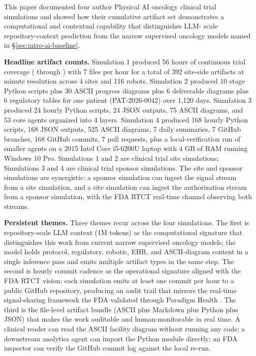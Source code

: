
This paper documented four author Physical AI oncology clinical trial
simulations and showed how their cumulative artifact set demonstrates
a computational and contextual capability that distinguishes LLM-
scale repository-context prediction from the narrow supervised
oncology models named in \S\ref{sec:intro-ai-baseline}.

\textbf{Headline artifact counts.} Simulation 1 produced 56 hours of
continuous trial coverage ( through )
with 7 files per hour for a total of 392 site-side artifacts at
minute resolution across 4 sites and 116 robots. Simulation 2
produced 10 stage Python scripts plus 30 ASCII progress diagrams plus
6 deliverable diagrams plus 6 regulatory tables for one patient
(PAT-2026-0042) over 1,120 days. Simulation 3 produced 24 hourly
Python scripts, 24 JSON outputs, 75 ASCII diagrams, and 53 core
agents organized into 4 layers. Simulation 4 produced 168 hourly
Python scripts, 168 JSON outputs, 525 ASCII diagrams, 7 daily
summaries, 7 GitHub branches, 168 GitHub commits, 7 pull requests,
plus a local-verification run of smaller agents on a 2015 Intel Core i5-6200U
laptop with 4 GB of RAM running Windows 10 Pro. Simulations 1 and 2
are clinical trial site simulations; Simulations 3 and 4 are clinical
trial sponsor simulations. The site and sponsor simulations are
synergistic: a sponsor simulation can ingest the signal stream from a
site simulation, and a site simulation can ingest the authorization
stream from a sponsor simulation, with the FDA RTCT real-time channel
observing both streams.

\textbf{Persistent themes.} Three themes recur across the four
simulations. The first is repository-scale LLM context (1M tokens) as
the computational signature that distinguishes this work from current
narrow supervised oncology models; the model holds protocol,
regulatory, robotic, EHR, and ASCII-diagram content in a single
inference pass and emits multiple artifact types in the same step.
The second is hourly commit cadence as the operational signature
aligned with the FDA RTCT vision; each simulation emits at least one
commit per hour to a public GitHub repository, producing an audit
trail that mirrors the real-time signal-sharing framework the FDA
validated through Paradigm Health \cite{fda2026realtime}. The third
is the file-level artifact bundle (ASCII plus Markdown plus Python
plus JSON) that makes the work auditable and human-monitorable in
real time. A clinical reader can read the ASCII facility diagram
without running any code; a downstream analytics agent can import
the Python module directly; an FDA inspector can verify the GitHub
commit log against the local re-run.

